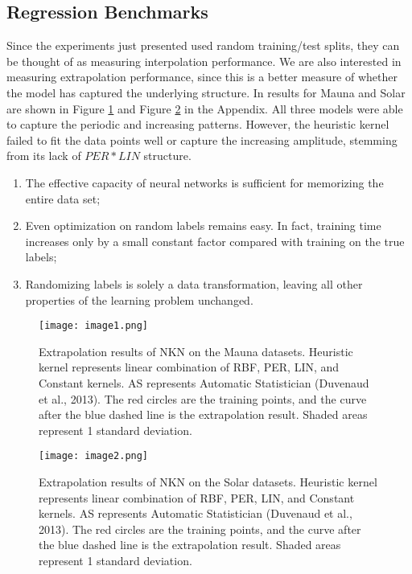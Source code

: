 \documentclass[9pt,a4paper,twoside]{tau}
\begin{document}
    \subsection{Regression Benchmarks}
       Since the experiments just presented used random training/test splits, they can be thought of as measuring interpolation performance. We are also interested in measuring extrapolation performance, since this is a better measure of whether the model has captured the underlying structure. In results for Mauna and Solar are shown in Figure \ref{fig:enter-label} and Figure \ref{fig:enter-labe2} in the Appendix. All three models were able to capture the periodic and increasing patterns. However, the heuristic kernel failed to fit the data points well or capture the increasing amplitude, stemming from its lack of $PER \ast LIN$ structure. 
       \begin{enumerate}
       \item The effective capacity of neural networks is sufficient for memorizing the entire data set;
       \item Even optimization on random labels remains easy. In fact, training time increases only by a small constant factor compared with training on the true labels; 
       \item Randomizing labels is solely a data transformation, leaving all other properties of the learning problem unchanged.
\end{enumerate}
\begin{figure}[H]
    \centering
    \texttt{[image: image1.png]}
    \caption{Extrapolation results of NKN on the Mauna datasets. Heuristic kernel represents linear combination of RBF, PER, LIN, and Constant kernels. AS represents Automatic Statistician (Duvenaud et al., 2013). The red circles are the training points, and the curve after the blue dashed line is the extrapolation result. Shaded areas represent 1 standard deviation.}
    \label{fig:enter-label}
\end{figure}
\begin{figure}[H]
    \centering
    \texttt{[image: image2.png]}
    \caption{Extrapolation results of NKN on the Solar datasets. Heuristic kernel represents linear combination of RBF, PER, LIN, and Constant kernels. AS represents Automatic Statistician (Duvenaud et al., 2013). The red circles are the training points, and the curve after the blue dashed line is the extrapolation result. Shaded areas represent 1 standard deviation.}
    \label{fig:enter-labe2}
\end{figure}
\end{document}

